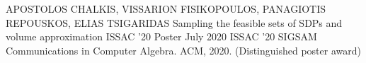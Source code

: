 

\begin{cventries}

  \cventry
    {APOSTOLOS CHALKIS, VISSARION FISIKOPOULOS, PANAGIOTIS REPOUSKOS, ELIAS TSIGARIDAS} %
    {Sampling the feasible sets of SDPs and volume approximation} %
    {ISSAC '20 Poster} %
    {July 2020} %
    {ISSAC '20 SIGSAM Communications in Computer Algebra. ACM, 2020. (Distinguished poster award)}


\end{cventries}
